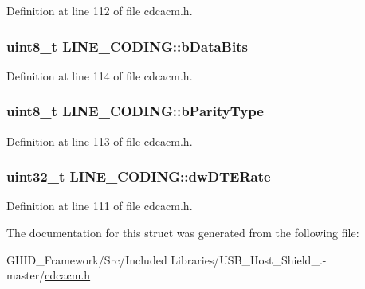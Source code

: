 \-Definition at line 112 of file cdcacm.\-h.

\hypertarget{struct_l_i_n_e___c_o_d_i_n_g_a2c360b6f874f2cf45f95492f9e6c1812}{
\subsubsection[{b\-Data\-Bits}]{\setlength{\rightskip}{0pt plus 5cm}uint8\-\_\-t {\bf \-L\-I\-N\-E\-\_\-\-C\-O\-D\-I\-N\-G\-::b\-Data\-Bits}}}\label{struct_l_i_n_e___c_o_d_i_n_g_a2c360b6f874f2cf45f95492f9e6c1812}


\-Definition at line 114 of file cdcacm.\-h.

\hypertarget{struct_l_i_n_e___c_o_d_i_n_g_ad14985344c9e31a210999dfa0b4ccc42}{
\subsubsection[{b\-Parity\-Type}]{\setlength{\rightskip}{0pt plus 5cm}uint8\-\_\-t {\bf \-L\-I\-N\-E\-\_\-\-C\-O\-D\-I\-N\-G\-::b\-Parity\-Type}}}\label{struct_l_i_n_e___c_o_d_i_n_g_ad14985344c9e31a210999dfa0b4ccc42}


\-Definition at line 113 of file cdcacm.\-h.

\hypertarget{struct_l_i_n_e___c_o_d_i_n_g_ae9fd7d7247b4c50df89a6dd5ed955073}{
\subsubsection[{dw\-D\-T\-E\-Rate}]{\setlength{\rightskip}{0pt plus 5cm}uint32\-\_\-t {\bf \-L\-I\-N\-E\-\_\-\-C\-O\-D\-I\-N\-G\-::dw\-D\-T\-E\-Rate}}}\label{struct_l_i_n_e___c_o_d_i_n_g_ae9fd7d7247b4c50df89a6dd5ed955073}


\-Definition at line 111 of file cdcacm.\-h.



\-The documentation for this struct was generated from the following file\-:\begin{DoxyCompactItemize}
\item 
\-G\-H\-I\-D\-\_\-\-Framework/\-Src/\-Included Libraries/\-U\-S\-B\-\_\-\-Host\-\_\-\-Shield\-\_.-\/master/\hyperlink{cdcacm_8h}{cdcacm.\-h}\end{DoxyCompactItemize}
